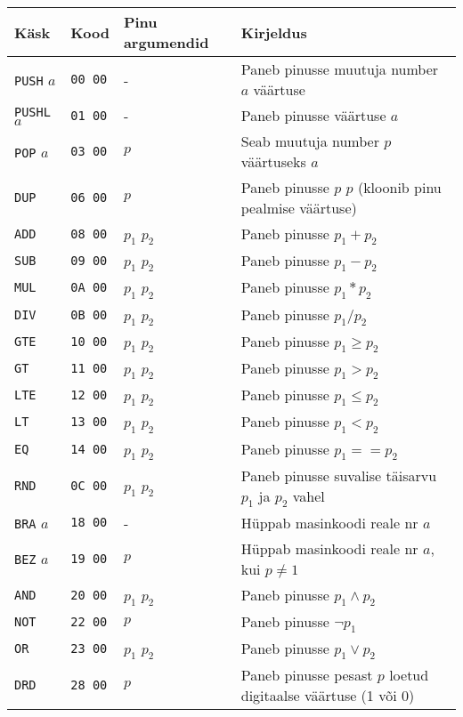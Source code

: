 \begin{longtable}{l|l|l|X}
	Käsk & Kood & Pinu argumendid & Kirjeldus \\
	\hline 
	\endhead
	\texttt{PUSH} $a$ & \texttt{00 00} & - & Paneb pinusse muutuja number $a$ väärtuse \\
	\texttt{PUSHL} $a$ & \texttt{01 00} & - & Paneb pinusse väärtuse $a$ \\
	\texttt{POP} $a$ & \texttt{03 00}  & $p$ & Seab muutuja number $p$ väärtuseks $a$ \\
	\texttt{DUP} & \texttt{06 00} & $p$ & Paneb pinusse $p$ $p$ (kloonib pinu pealmise väärtuse) \\
	\texttt{ADD} & \texttt{08 00} & $p_1$ $p_2$ & Paneb pinusse $p_1 + p_2$ \\
	\texttt{SUB} & \texttt{09 00} & $p_1$ $p_2$ & Paneb pinusse $p_1 - p_2$ \\
	\texttt{MUL} & \texttt{0A 00} & $p_1$ $p_2$ & Paneb pinusse $p_1 * p_2$ \\
	\texttt{DIV} & \texttt{0B 00} & $p_1$ $p_2$ & Paneb pinusse $p_1 / p_2$ \\
	\texttt{GTE} & \texttt{10 00} & $p_1$ $p_2$ & Paneb pinusse $p_1 \geq p_2$ \\
	\texttt{GT} & \texttt{11 00} & $p_1$ $p_2$ & Paneb pinusse $p_1 > p_2$ \\
	\texttt{LTE} & \texttt{12 00} & $p_1$ $p_2$ & Paneb pinusse $p_1 \leq p_2$ \\
	\texttt{LT} & \texttt{13 00} & $p_1$ $p_2$ & Paneb pinusse $p_1 < p_2$ \\
	\texttt{EQ} & \texttt{14 00} & $p_1$ $p_2$ & Paneb pinusse $p_1 == p_2$ \\
	\texttt{RND} & \texttt{0C 00} & $p_1$ $p_2$ & Paneb pinusse suvalise täisarvu $p_1$ ja $p_2$ vahel \\
	\texttt{BRA} $a$ & \texttt{18 00}  & - & Hüppab masinkoodi reale nr $a$ \\
	\texttt{BEZ} $a$ & \texttt{19 00} & $p$ & Hüppab masinkoodi reale nr $a$, kui $p \neq 1$ \\
	\texttt{AND} & \texttt{20 00} & $p_1$ $p_2$ & Paneb pinusse $p_1 \land p_2$ \\
	\texttt{NOT} & \texttt{22 00} & $p$ & Paneb pinusse  $\neg p_1$ \\
	\texttt{OR} & \texttt{23 00} & $p_1$ $p_2$ & Paneb pinusse $p_1 \lor p_2$ \\
	\texttt{DRD} & \texttt{28 00} & $p$ & Paneb pinusse pesast $p$ loetud digitaalse väärtuse (1 või 0) \\

\end{longtable}
